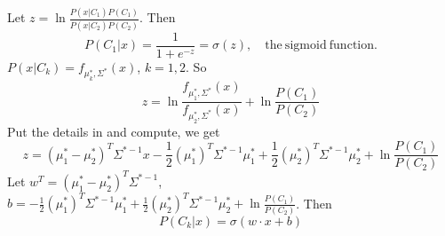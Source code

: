 \documentclass[../main.tex]{subfiles}
\begin{document}
            Let $z=\ln \frac{P(x|C_1)P(C_1)}{P(x|C_2)P(C_2)}$. Then
            \[
                P(C_1|x)=\frac{1}{1+e^{-z}}=\sigma(z),\quad\mathrm{the~sigmoid~function}.
            \]
            $P(x|C_k)=f_{\mu_k^*,\Sigma^*}(x)$, $k=1,2$. So
            \[
                z=\ln\frac{f_{\mu_1^*,\Sigma^*}(x)}{f_{\mu_2^*,\Sigma^*}(x)}+\ln\frac{P(C_1)}{P(C_2)}
            \]
            Put the details in and compute, we get
            \[
                z = (\mu_1^*-\mu_2^*)^T\Sigma^{*-1}x-\frac{1}{2}(\mu_1^*)^T\Sigma^{*-1}\mu_1^*+\frac{1}{2}(\mu_2^*)^T\Sigma^{*-1}\mu_2^*+\ln\frac{P(C_1)}{P(C_2)}
            \]
            Let $w^T=(\mu_1^*-\mu_2^*)^T\Sigma^{*-1}$, $b=-\frac{1}{2}(\mu_1^*)^T\Sigma^{*-1}\mu_1^*+\frac{1}{2}(\mu_2^*)^T\Sigma^{*-1}\mu_2^*+\ln\frac{P(C_1)}{P(C_2)}$. Then
            \[
                P(C_k|x)=\sigma(w \cdot x+b)
            \]
\end{document}

